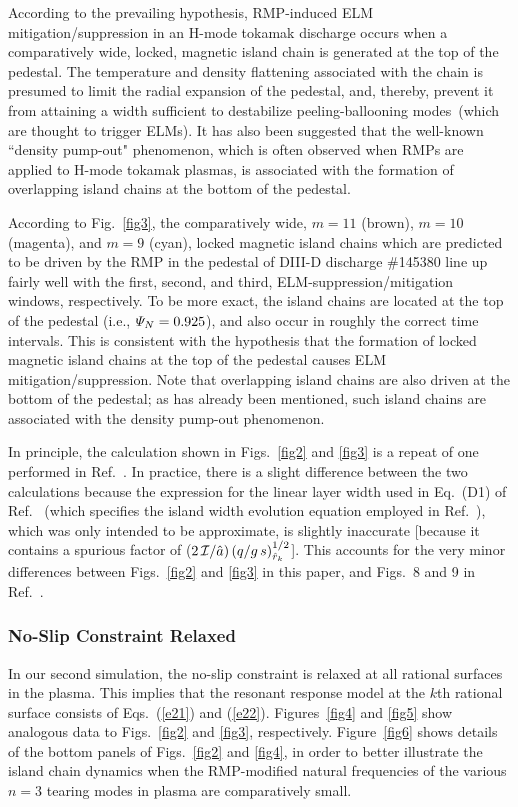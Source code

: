 \documentclass[12pt,prb,aps]{revtex4-1}
\begin{document}
According to the prevailing hypothesis, RMP-induced ELM mitigation/suppression in an H-mode tokamak discharge occurs when a comparatively wide, locked, magnetic
island chain is generated at the top of the pedestal.\cite{hu} The temperature and density flattening associated with the chain
is presumed to limit the radial expansion of the
pedestal, and, thereby, prevent it from attaining a width sufficient to destabilize peeling-ballooning modes\,\cite{connor}  (which are thought to trigger ELMs).\cite{d3d}
It has also been suggested that  the well-known ``density pump-out" phenomenon, which is often observed when RMPs are applied
to H-mode tokamak plasmas, is associated with the formation of overlapping island chains
at the bottom of the pedestal.\cite{hu}

According to Fig.~\ref{fig3},  
 the comparatively wide, $m=11$ (brown),  $m=10$ (magenta), and  $m=9$ (cyan), locked magnetic island chains which are predicted to be driven by the RMP in the pedestal of DIII-D discharge \#145380 line up
fairly well with the first, second, and third, ELM-suppression/mitigation windows, respectively. To be more exact, the island chains are located at
the top of the pedestal (i.e., ${\mit\Psi}_N=0.925$), and also occur in roughly the correct time intervals. This is consistent with the hypothesis that the formation of locked
magnetic island chains at the top of the pedestal causes ELM mitigation/suppression. 
Note that overlapping island chains
are also driven at the bottom of the pedestal; as has already been mentioned, such island chains are associated with the density pump-out phenomenon. 

In principle, the calculation shown in Figs.~\ref{fig2} and \ref{fig3} is a repeat of one performed in Ref.~. In practice, there is a slight difference between
the two calculations because the expression for the linear layer width used in Eq.~(D1) of Ref.~ (which specifies the island width evolution
equation employed in Ref.~), which was only intended to be approximate,  is slightly inaccurate [because it contains a spurious factor of ($2\,{\cal I}/\hat{a})\,(q/g\,s)^{1/2}_{\hat{r}_k}$]. This accounts for the very minor differences between Figs.~\ref{fig2} and \ref{fig3} in this
paper, and Figs.~8 and 9 in Ref.~. 

\subsubsection{No-Slip Constraint Relaxed}
In our second simulation, the no-slip constraint is relaxed at all rational surfaces in the plasma. This implies that the resonant response
model at the $k$th rational surface consists of Eqs.~(\ref{e21}) and (\ref{e22}). Figures~\ref{fig4} and \ref{fig5} show analogous 
data to Figs.~\ref{fig2} and \ref{fig3}, respectively. Figure~\ref{fig6} shows details of the bottom panels of Figs.~\ref{fig2} and \ref{fig4},
in order to better illustrate the island chain dynamics when the  RMP-modified natural frequencies of the various $n=3$ tearing modes in  plasma
are comparatively small. 
\end{document}
